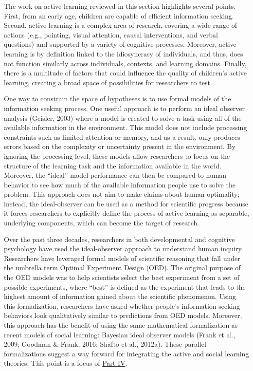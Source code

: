 \documentclass[english,floatsintext,man]{apa6}
\theoremstyle{definition}
\theoremstyle{definition}
\theoremstyle{definition}
\theoremstyle{remark}
\begin{document}
The work on active learning reviewed in this section highlights several
points. First, from an early age, children are capable of efficient
information seeking. Second, active learning is a complex area of
research, covering a wide range of actions (e.g., pointing, visual
attention, causal interventions, and verbal questions) and supported by
a variety of cognitive processes. Moreover, active learning is by
definition linked to the idiosyncrasy of individuals, and thus, does not
function similarly across individuals, contexts, and learning domains.
Finally, there is a multitude of factors that could influence the
quality of children's active learning, creating a broad space of
possibilities for researchers to test.

One way to constrain the space of hypotheses is to use formal models of
the information seeking process. One useful approach is to perform an
ideal observer analysis (Geisler, 2003) where a model is created to
solve a task using all of the available information in the environment.
This model does not include processing constraints such as limited
attention or memory, and as a result, only produces errors based on the
complexity or uncertainty present in the environment. By ignoring the
processing level, these models allow researchers to focus on the
structure of the learning task and the information available in the
world. Moreover, the \enquote{ideal} model performance can then be
compared to human behavior to see how much of the available information
people use to solve the problem. This approach does not aim to make
claims about human optimality; instead, the ideal-observer can be used
as a method for scientific progress because it forces researchers to
explicitly define the process of active learning as separable,
underlying components, which can become the target of research.

Over the past three decades, researchers in both developmental and
cognitive psychology have used the ideal-observer approach to understand
human inquiry. Researchers have leveraged formal models of scientific
reasoning that fall under the umbrella term Optimal Experiment Design
(OED). The original purpose of the OED models was to help scientists
select the best experiment from a set of possible experiments, where
\enquote{best} is defined as the experiment that leads to the highest
amount of information gained about the scientific phenomenon. Using this
formalization, researchers have asked whether people's information
seeking behaviors look qualitatively similar to predictions from OED
models. Moreover, this approach has the benefit of using the same
mathematical formalization as recent models of social learning: Bayesian
ideal observer models (Frank et al., 2009; Goodman \& Frank, 2016;
Shafto et al., 2012a). These parallel formalizations suggest a way
forward for integrating the active and social learning theories. This
point is a focus of \protect\hyperlink{p4}{Part IV}.
\end{document}
